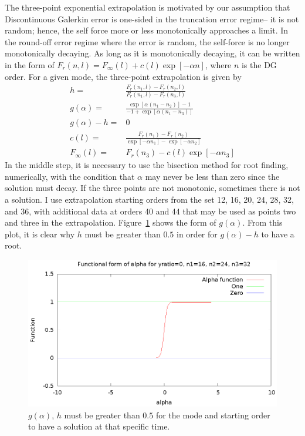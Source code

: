 The three-point exponential extrapolation is motivated by our assumption that Discontinuous Galerkin error is one-sided in the truncation error regime-- it is not random; hence, the self force more or less monotonically approaches a limit. In the round-off error regime where the error is random, the self-force is no longer monotonically decaying. As long as it is monotonically decaying, it can be written in the form of $F_r(n,l)=F_\infty(l)+c(l)\exp[-\alpha n]$, where $n$ is the DG order. For a given mode, the three-point extrapolation is given by
\begin{eqnarray}
h=&\frac{F_r(n_1,l)-F_r(n_2,l)}{F_r(n_1,l)-F_r(n_3,l)}\\
g(\alpha)=&\frac{\exp[\alpha(n_1-n_2)]-1}{-1+\exp[\alpha(n_1-n_3)]}\\
g(\alpha)-h=&0\\
c(l)=&\frac{F_r(n_1)-F_r(n_2)}{\exp[-\alpha n_1]-\exp[-\alpha n_2]}\\
F_\infty(l)=&F_r(n_3)-c(l)\exp[-\alpha n_3]
\end{eqnarray}
In the middle step, it is necessary to use the bisection method for root finding, numerically, with the condition that $\alpha$ may never be less than zero since the solution must decay. If the three points are not monotonic, sometimes there is not a solution. I use extrapolation starting orders from the set 12, 16, 20, 24, 28, 32, and 36, with additional data at orders 40 and 44 that may be used as points two and three in the extrapolation. Figure~\ref{galpha} shows the form of $g(\alpha)$. From this plot, it is clear why $h$ must be greater than $0.5$ in order for $g(\alpha)-h$ to have a root. 


\begin{figure}
  \includegraphics{alphafunction}
  \caption{$g(\alpha)$, $h$ must be greater than $0.5$ for the mode and starting order to have a solution at that specific time.}
  \label{galpha}
\end{figure}



